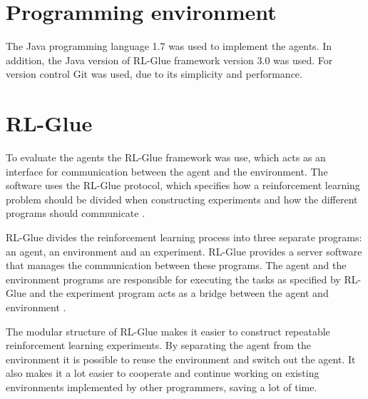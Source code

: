 \section{Programming environment}
\label{sec:prog_env}

The Java programming language 1.7 was used to implement the agents. In addition, the
Java version of RL-Glue framework version 3.0 was used. For version control Git
was used, due to its simplicity and performance.

\section{RL-Glue}
\label{sec:rl_glue}

To evaluate the agents the RL-Glue framework was use, which acts as an
interface for communication between the agent and the environment. The software
uses the RL-Glue protocol, which specifies how a reinforcement learning problem
should be divided when constructing experiments and how the different programs
should communicate \parencite{tanner2009rl}.

RL-Glue divides the reinforcement learning process into three separate
programs: an agent, an environment and an experiment. RL-Glue provides a server
software that manages the communication between these programs. The agent and
the environment programs are responsible for executing the tasks as specified
by RL-Glue and the experiment program acts as a bridge between the agent and
environment \parencite{tanner2009rl}.

The modular structure of RL-Glue makes it easier to construct repeatable
reinforcement learning experiments. By separating the agent from the
environment it is possible to reuse the environment and switch out the agent.
It also makes it a lot easier to cooperate and continue working on existing
environments implemented by other programmers, saving a lot of time.
